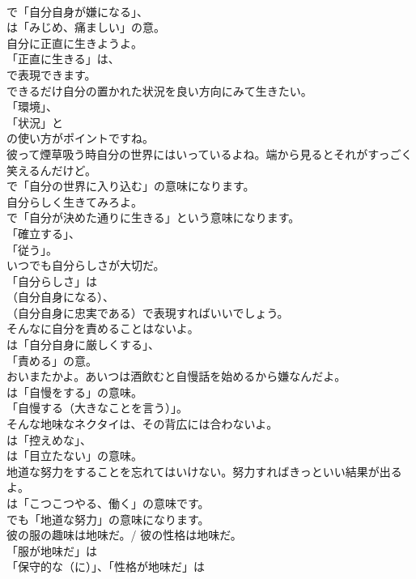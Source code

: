 \documentclass[8pt]{extreport}
\begin{document}
\begin{CJK}{UTF8}{min}
\\	で「自分自身が嫌になる」、
\\	は「みじめ、痛ましい」の意。	
\\	自分に正直に生きようよ。 
\\	「正直に生きる」は、
\\	で表現できます。	
\\	できるだけ自分の置かれた状況を良い方向にみて生きたい。 
\\	「環境」、
\\	「状況」と
\\	の使い方がポイントですね。	
\\	彼って煙草吸う時自分の世界にはいっているよね。端から見るとそれがすっごく笑えるんだけど。 
\\	で「自分の世界に入り込む」の意味になります。	
\\	自分らしく生きてみろよ。 
\\	で「自分が決めた通りに生きる」という意味になります。
\\	「確立する」、
\\	「従う」。	
\\	いつでも自分らしさが大切だ。 
\\	「自分らしさ」は 
\\	（自分自身になる）、
\\	（自分自身に忠実である）で表現すればいいでしょう。	
\\	そんなに自分を責めることはないよ。 
\\	は「自分自身に厳しくする」、
\\	「責める」の意。	
\\	おいまたかよ。あいつは酒飲むと自慢話を始めるから嫌なんだよ。 
\\	は「自慢をする」の意味。
\\	「自慢する（大きなことを言う）」。	
\\	そんな地味なネクタイは、その背広には合わないよ。 
\\	は「控えめな」、
\\	は「目立たない」の意味。	
\\	地道な努力をすることを忘れてはいけない。努力すればきっといい結果が出るよ。 
\\	は「こつこつやる、働く」の意味です。
\\	でも「地道な努力」の意味になります。	
\\	彼の服の趣味は地味だ。/ 彼の性格は地味だ。 
\\	「服が地味だ」は
\\	「保守的な（に）」、「性格が地味だ」は

\end{CJK}
\end{document}
